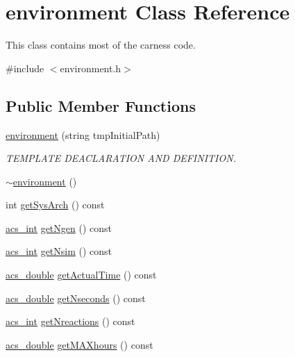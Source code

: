 \hypertarget{a00011}{\section{environment Class Reference}
\label{a00011}
}


This class contains most of the carness code.  




{\ttfamily \#include $<$environment.\-h$>$}

\subsection*{Public Member Functions}
\begin{DoxyCompactItemize}
\item 
\hyperlink{a00011_aa44bbabec52bf2d61a19685a30e68de1}{environment} (string tmp\-Initial\-Path)
\begin{DoxyCompactList}\small\item\em T\-E\-M\-P\-L\-A\-T\-E D\-E\-A\-C\-L\-A\-R\-A\-T\-I\-O\-N A\-N\-D D\-E\-F\-I\-N\-I\-T\-I\-O\-N. \end{DoxyCompactList}\item 
\hyperlink{a00011_ae323954bd5b674bf34d954c3f7b67629}{$\sim$environment} ()
\item 
int \hyperlink{a00011_a8cccdaf0b544847601797bf19367f1ee}{get\-Sys\-Arch} () const 
\item 
\hyperlink{a00024_a8d277355641a098190360234e2ebde35}{acs\-\_\-int} \hyperlink{a00011_afad68362d5f4ec0689941e3c1b92c2e8}{get\-Ngen} () const 
\item 
\hyperlink{a00024_a8d277355641a098190360234e2ebde35}{acs\-\_\-int} \hyperlink{a00011_a5a8522899b3e84b9c394d5d83d1e5c63}{get\-Nsim} () const 
\item 
\hyperlink{a00024_ab776853a005fcbf56af0424a2a4dd607}{acs\-\_\-double} \hyperlink{a00011_a14bad649a73246617361f0e1765f49f8}{get\-Actual\-Time} () const 
\item 
\hyperlink{a00024_ab776853a005fcbf56af0424a2a4dd607}{acs\-\_\-double} \hyperlink{a00011_aa850c2805e508b2aac4fbd5d5f9de77b}{get\-Nseconds} () const 
\item 
\hyperlink{a00024_a8d277355641a098190360234e2ebde35}{acs\-\_\-int} \hyperlink{a00011_a5cb9cf3968f19e23f6c54f4c915cf878}{get\-Nreactions} () const 
\item 
\hyperlink{a00024_ab776853a005fcbf56af0424a2a4dd607}{acs\-\_\-double} \hyperlink{a00011_af2b482132fc3ab299118f7a894bd53a2}{get\-M\-A\-Xhours} () const 

\end{DoxyCompactItemize}

